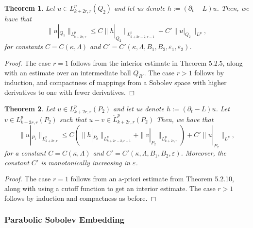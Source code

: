\documentclass[10pt, a4paper]{article}
\theoremstyle{plain}%
\newtheorem{theorem}{Theorem}[section]
\theoremstyle{definition}
\numberwithin{figure}{section}
\numberwithin{equation}{section}
\newcommand{\pa}{\partial}
\newcommand{\ep}{\varepsilon}
\begin{document}
\begin{theorem}\label{thm_ffestimate}
	Let $u \in L^p_{k+2r,r}(Q_2)$ and let us denote $h:= (\pa_t - L)u$. Then, we have that
	\begin{equation}\label{eq_ffestimate}
		\|u|_{Q_1}\|_{L^p_{k+2r,r} } \leq C\|h|_{Q_2}\|_{L^p_{k+2r-2,r-1}} + C'\|u|_{Q_2}\|_{L^p},
	\end{equation}
	for constants $C = C(\kappa,\Lambda)$ and $C' = C'(\kappa,\Lambda,B_1,B_2,\ep_1,\ep_2)$. 
\end{theorem}
\begin{proof}
	The case $r=1$ follows from the interior estimate in \cite{Kry08} Theorem 5.2.5, along with an estimate over an intermediate ball $Q_{R'}$. The case $r>1$ follows by induction, and compactness of mappings from a Sobolev space with higher derivatives to one with fewer derivatives.
\end{proof}

\begin{theorem}\label{thm_bfestimate}
	Let $u \in L^p_{k+2r,r}(P_2)$ and let us denote $h:= (\pa_t - L)u$. Let $v\in L^p_{k+2r,r}(P_2)$ such that $u-v\in \mathring{L}^p_{k+2r,r}(P_2)$ Then, we have that
	\begin{equation}\label{eq_bfestimate}
		\|u|_{P_1}\|_{L^p_{k+2r,r}} \leq C(\|h|_{P_2}\|_{L^p_{k+2r-2,r-1}} + \|v|_{ P_2}\|_{L^p_{k+2r,r}}) + C'\|u|_{P_2}\|_{L^p},
	\end{equation}
	for a constant $C = C(\kappa,\Lambda)$ and $C' = C'(\kappa,\Lambda,B_1,B_2,\ep)$. Moreover, the constant $C'$ is monotonically increasing in $\ep$. 
	
\end{theorem}
\begin{proof}
	The case $r=1$ follows from an a-priori estimate from \cite{Kry08} Theorem 5.2.10, along with using a cutoff function to get an interior estimate. The case $r>1$ follows by induction and compactness as before.
\end{proof}





\subsubsection{Parabolic Sobolev Embedding}
\end{document}
